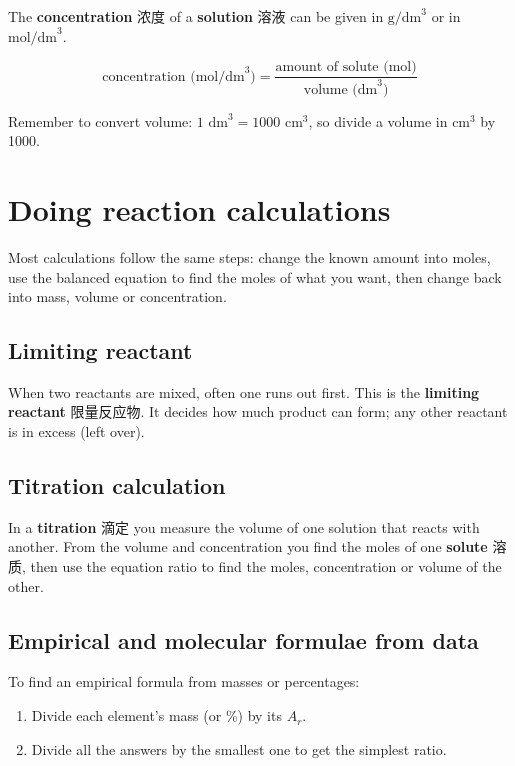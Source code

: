 \documentclass[11pt]{article}
\begin{document}
The \textbf{concentration} 浓度 of a \textbf{solution} 溶液 can be given in $\text{g/dm}^3$ or in $\text{mol/dm}^3$.

\[
\text{concentration (mol/dm}^3) = \frac{\text{amount of solute (mol)}}{\text{volume (dm}^3)}
\]

Remember to convert volume: $1 \text{ dm}^3 = 1000 \text{ cm}^3$, so divide a volume in $\text{cm}^3$ by 1000.

\section*{Doing reaction calculations}

Most calculations follow the same steps: change the known amount into moles, use the balanced equation to find the moles of what you want, then change back into mass, volume or concentration.

\subsection*{Limiting reactant}

When two reactants are mixed, often one runs out first. This is the \textbf{limiting reactant} 限量反应物. It decides how much product can form; any other reactant is in excess (left over).

\subsection*{Titration calculation}

In a \textbf{titration} 滴定 you measure the volume of one solution that reacts with another. From the volume and concentration you find the moles of one \textbf{solute} 溶质, then use the equation ratio to find the moles, concentration or volume of the other.

\subsection*{Empirical and molecular formulae from data}

To find an empirical formula from masses or percentages:

\begin{enumerate}
\item Divide each element's mass (or \%) by its $A_r$.

\item Divide all the answers by the smallest one to get the simplest ratio.

\end{enumerate}
\end{document}
